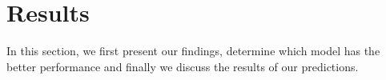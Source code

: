 \section{Results}
In this section, we first present our findings, determine which model has the
better performance and finally we discuss the results of our predictions.

